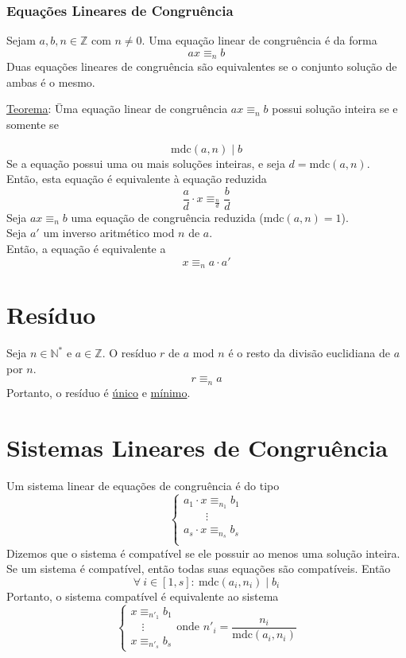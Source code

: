 \documentclass{article}
\begin{document}
\subsubsection{Equações Lineares de Congruência}
Sejam $a, b, n \in \mathbb{Z}$ com $n \neq 0$. Uma equação linear de congruência é da forma
\[ ax \equiv_n b \]
Duas equações lineares de congruência são equivalentes se o conjunto solução de ambas é o mesmo.\\
\begin{tabbing}
  \uline{Teorema}: \= Uma equação linear de congruência $ax \equiv_n b$ possui solução inteira se e somente se \\[5pt]
  \>\begin{minipage}{\textwidth}
    \[ \text{mdc}(a,n) \mid b \]
    Se a equação possui uma ou mais soluções inteiras, e seja $d = \text{mdc}(a,n)$. \\
    Então, esta equação é equivalente à equação reduzida
    \[ \frac{a}{d} \cdot x \equiv_{\frac{n}{d}} \frac{b}{d} \]
    Seja $ax \equiv_n b$ uma equação de congruência reduzida ($\text{mdc}(a, n) = 1$). \\
    Seja $a'$ um inverso aritmético mod $n$ de $a$. \\
    Então, a equação é equivalente a
    \[ x \equiv_n a \cdot a' \]
  \end{minipage}
\end{tabbing}



\section{Resíduo}
Seja $n \in \mathbb{N}^*$ e $a \in \mathbb{Z}$. O resíduo $r$ de $a$ mod $n$ é o resto da divisão euclidiana de $a$ por $n$.
\[ r \equiv_n a \]
Portanto, o resíduo é \uline{único} e \uline{mínimo}.




\section{Sistemas Lineares de Congruência}
Um sistema linear de equações de congruência é do tipo
\[
  \begin{cases}
    a_1 \cdot x \equiv_{n_1} b_1 \\
    \qquad \vdots \\
    a_s \cdot x \equiv_{n_s} b_s \\
  \end{cases}
\]
Dizemos que o sistema é compatível se ele possuir ao menos uma solução inteira. \\[5pt]
Se um sistema é compatível, então todas suas equações são compatíveis. Então
\[ \forall\: i \in [1, s]:\> \text{mdc}(a_i, n_i) \mid b_i \]
Portanto, o sistema compatível é equivalente ao sistema
\[
  \begin{cases}
    x \equiv_{n'_1} b_1 \\
    \quad \vdots \\
    x \equiv_{n'_s} b_s
  \end{cases}
  \text{onde } n'_i = \frac{n_i}{\text{mdc}(a_i, n_i)}
\]

\end{document}
